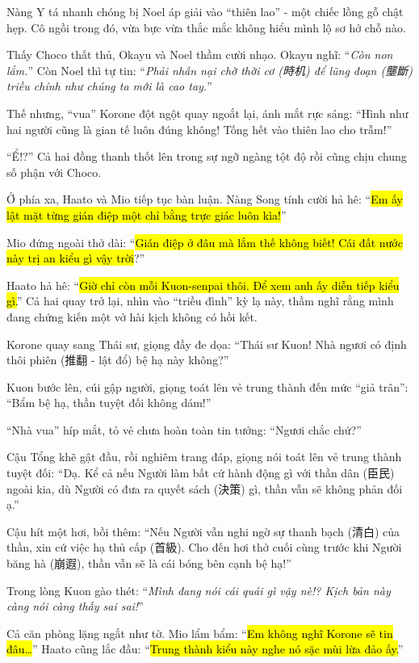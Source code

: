 \documentclass[../main.tex]{subfiles}
\begin{document}
Nàng Y tá nhanh chóng bị Noel áp giải vào ``thiên lao'' - một chiếc lồng gỗ chật hẹp. Cô ngồi trong đó, vừa bực vừa thắc mắc không hiểu mình lộ sơ hở chỗ nào.

Thấy Choco thất thủ, Okayu và Noel thầm cười nhạo. Okayu nghĩ: ``\textit{Còn non lắm.}'' Còn Noel thì tự tin: ``\textit{Phải nhẫn nại chờ thời cơ (時机) để lũng đoạn (壟斷) triều chính như chúng ta mới là cao tay.}''

Thế nhưng, ``vua'' Korone đột ngột quay ngoắt lại, ánh mắt rực sáng: ``Hình như hai người cũng là gian tế luôn đúng không! Tống hết vào thiên lao cho trẫm!''


``Ể!?'' Cả hai đồng thanh thốt lên trong sự ngỡ ngàng tột độ rồi cũng chịu chung số phận với Choco.

Ở phía xa, Haato và Mio tiếp tục bàn luận. Nàng Song tính cười hả hê: ``\hl{Em ấy lật mặt từng gián điệp một chỉ bằng trực giác luôn kìa!}''

Mio đứng ngoài thở dài: ``\hl{Gián điệp ở đâu mà lắm thế không biết! Cái đất nước này trị an kiểu gì vậy trời}?''

Haato hả hê: ``\hl{Giờ chỉ còn mỗi Kuon-senpai thôi. Để xem anh ấy diễn tiếp kiểu gì.}'' Cả hai quay trở lại, nhìn vào ``triều đình'' kỳ lạ này, thầm nghĩ rằng mình đang chứng kiến một vở hài kịch không có hồi kết.

Korone quay sang Thái sư, giọng đầy đe dọa: ``Thái sư Kuon! Nhà ngươi có định thôi phiên (推翻 - lật đổ) bệ hạ này không?''

Kuon bước lên, cúi gập người, giọng toát lên vẻ trung thành đến mức ``giả trân'': ``Bẩm bệ hạ, thần tuyệt đối không dám!''

``Nhà vua'' híp mắt, tỏ vẻ chưa hoàn toàn tin tưởng: ``Ngươi chắc chứ?''

Cậu Tổng khẽ gật đầu, rồi nghiêm trang đáp, giọng nói toát lên vẻ trung thành tuyệt đối: ``Dạ. Kể cả nếu Người làm bất cứ hành động gì với thần dân (臣民) ngoài kia, dù Người có đưa ra quyết sách (決策) gì, thần vẫn sẽ không phản đối ạ.''

Cậu hít một hơi, bồi thêm: ``Nếu Người vẫn nghi ngờ sự thanh bạch (清白) của thần, xin cứ việc hạ thủ cấp (首級). Cho đến hơi thở cuối cùng trước khi Người băng hà (崩遐), thần vẫn sẽ là cái bóng bên cạnh bệ hạ!''

Trong lòng Kuon gào thét: ``\textit{Mình đang nói cái quái gì vậy nè!? Kịch bản này càng nói càng thấy sai sai!}''

Cả căn phòng lặng ngắt như tờ. Mio lẩm bẩm: ``\hl{Em không nghĩ Korone sẽ tin đâu\dots}'' Haato cũng lắc đầu: ``\hl{Trung thành kiểu này nghe nó sặc mùi lừa đảo ấy.}''
\end{document}
